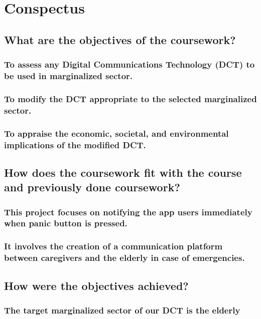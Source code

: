 \section{Conspectus}
\label{sec:cnspcts}

\IEEEpubidadjcol %

\subsection{What are the objectives of the coursework?}

\subsubsection{To assess any Digital Communications Technology (DCT) to be used in marginalized sector.}
\subsubsection{To modify the DCT appropriate to the selected marginalized sector.}
\subsubsection{To appraise the economic, societal, and environmental implications of the modified DCT.}

\subsection{How does the coursework fit with the course and previously done coursework?}
\subsubsection{This project focuses on notifying the app users immediately when panic button is pressed.}
\subsubsection{It involves the creation of a communication platform between caregivers and the elderly in case of emergencies.}

\subsection{How were the objectives achieved?}
\subsubsection{The target marginalized sector of our DCT is the elderly}
